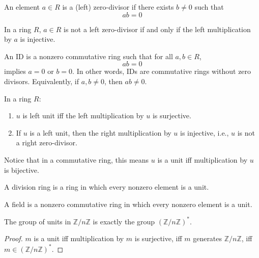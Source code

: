 \documentclass[openany]{book}
\newcommand{\Z}{\mathbb{Z}}
\begin{document}
\begin{defn}
    An element $a\in R$ is a (left) zero-divisor if there exists $b\neq 0$ such that 
    \begin{equation*}
        ab=0
    \end{equation*}
\end{defn}

\begin{prop}
    In a ring $R$, $a\in R$ is not a left zero-divisor if and only if the left multiplication by $a$ is injective.
\end{prop}

\begin{defn}
    An ID is a nonzero commutative ring such that for all $a,b\in R$, 
    \begin{equation*}
        ab=0
    \end{equation*}
    implies $a=0$ or $b=0$. In other words, IDs are commutative rings without zero divisors. Equivalently, if $a,b\neq 0$, then $ab\neq 0$.
\end{defn}


\begin{prop}
    In a ring $R$:
    \begin{enumerate}
        \item $u$ is left unit iff the left multiplication by $u$ is surjective. 
        \item If $u$ is a left unit, then the right multiplication by $u$ is injective, i.e., $u$ is not a right zero-divisor.
    \end{enumerate}
\end{prop}
Notice that in a commutative ring, this means $u$ is a unit iff multiplication by $u$ is bijective.

\begin{defn}
    A division ring is a ring in which every nonzero element is a unit.

    A field is a nonzero commutative ring in which every nonzero element is a unit.
\end{defn}


\begin{prop}
    The group of units in $\Z/n\Z$ is exactly the group $(\Z/n\Z)^*$.
\end{prop}
\begin{proof}
    $m$ is a unit iff multiplication by $m$ is surjective, iff $m$ generates $\Z/n\Z$, iff $m\in(\Z/n\Z)^*$.
\end{proof}
\end{document}

